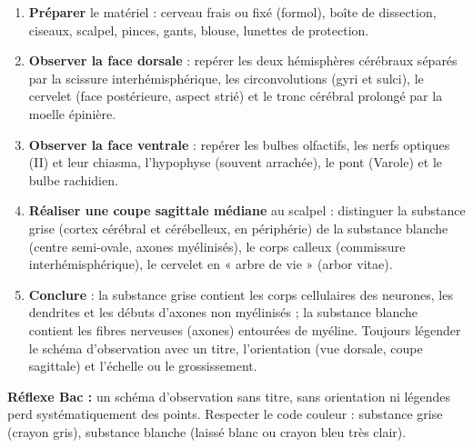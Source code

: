 \documentclass[11pt]{article}
\begin{document}
\begin{methode}
\begin{enumerate}
\item \textbf{Préparer} le matériel : cerveau frais ou fixé (formol), boîte de dissection, ciseaux, scalpel, pinces, gants, blouse, lunettes de protection.
\item \textbf{Observer la face dorsale} : repérer les deux hémisphères cérébraux séparés par la scissure interhémisphérique, les circonvolutions (gyri et sulci), le cervelet (face postérieure, aspect strié) et le tronc cérébral prolongé par la moelle épinière.
\item \textbf{Observer la face ventrale} : repérer les bulbes olfactifs, les nerfs optiques (II) et leur chiasma, l'hypophyse (souvent arrachée), le pont (Varole) et le bulbe rachidien.
\item \textbf{Réaliser une coupe sagittale médiane} au scalpel : distinguer la substance grise (cortex cérébral et cérébelleux, en périphérie) de la substance blanche (centre semi-ovale, axones myélinisés), le corps calleux (commissure interhémisphérique), le cervelet en « arbre de vie » (arbor vitae).
\item \textbf{Conclure} : la substance grise contient les corps cellulaires des neurones, les dendrites et les débuts d'axones non myélinisés ; la substance blanche contient les fibres nerveuses (axones) entourées de myéline. Toujours légender le schéma d'observation avec un titre, l'orientation (vue dorsale, coupe sagittale) et l'échelle ou le grossissement.
\end{enumerate}
\textbf{Réflexe Bac :} un schéma d'observation sans titre, sans orientation ni légendes perd systématiquement des points. Respecter le code couleur : substance grise (crayon gris), substance blanche (laissé blanc ou crayon bleu très clair).
\end{methode}
\end{document}
